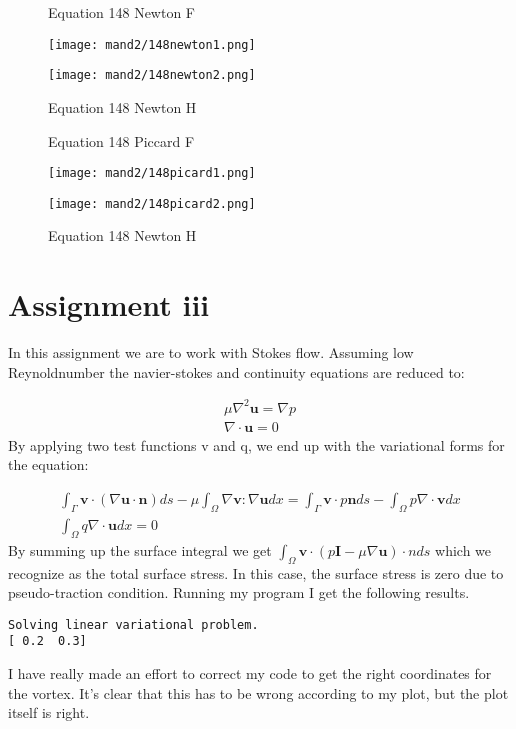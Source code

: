 \documentclass[a4paper,norsk]{article}
\begin{document}
\begin{figure}	
	\centering
	\caption*{Equation 148 Newton F}
	\texttt{[image: mand2/148newton1.png]}
	\caption*{Equation 148 Newton H}
	\texttt{[image: mand2/148newton2.png]}
\end{figure}

\begin{figure}	
	\centering
	\caption*{Equation 148 Piccard F}
	\texttt{[image: mand2/148picard1.png]}
	\caption*{Equation 148 Newton H}
	\texttt{[image: mand2/148picard2.png]}
\end{figure}
\newpage

\newpage

\section*{Assignment iii}
In this assignment we are to work with Stokes flow. Assuming low Reynoldnumber the navier-stokes and continuity equations are reduced to:

\begin{align*}
	\mu\nabla^2\textbf{u} = \nabla p \\
	\nabla \cdotp \textbf{u} = 0
\end{align*}
By applying two test functions v and q, we end up with the variational forms for the equation:

\begin{align*}
\int_{\Gamma}^{}\textbf{v} \cdot(\nabla \textbf{u}\cdot \textbf{n})ds -\mu \int_{\Omega}^{} \nabla \textbf{v}:\nabla \textbf{u} dx = \int_{\Gamma}^{}\textbf{v} \cdot p \textbf{n} ds
  - \int_{\Omega}^{}p\nabla \cdot \textbf{v}dx \\
\int_{\Omega}{}q\nabla \cdot \textbf{u} dx = 0
\end{align*}
By summing up the surface integral we get $\int_{\Omega}{} \textbf{v} \cdot (p \textbf{I}- \mu \nabla \textbf{u}) \cdot{n} ds$ which we recognize as the total surface stress. In this case, the surface stress is zero due to pseudo-traction condition.
Running my program I get the following results.

\begin{lstlisting}[style=terminal]
Solving linear variational problem.
[ 0.2  0.3]
\end{lstlisting} 
I have really made an effort to correct my code to get the right coordinates for the vortex. It's clear that this has to be wrong according to my plot, but the plot itself is right. 
\end{document}
